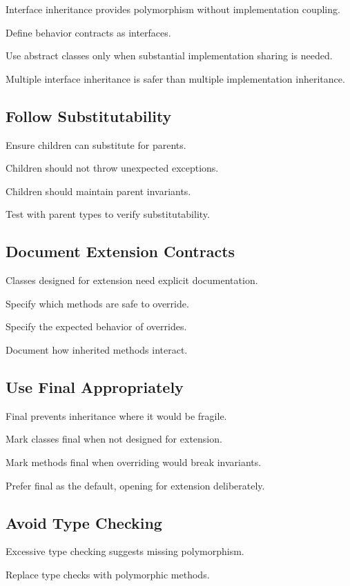 \documentclass[11pt]{article}
\begin{document}
Interface inheritance provides polymorphism without implementation coupling.

Define behavior contracts as interfaces.

Use abstract classes only when substantial implementation sharing is needed.

Multiple interface inheritance is safer than multiple implementation inheritance.

\subsection{Follow Substitutability}

Ensure children can substitute for parents.

Children should not throw unexpected exceptions.

Children should maintain parent invariants.

Test with parent types to verify substitutability.

\subsection{Document Extension Contracts}

Classes designed for extension need explicit documentation.

Specify which methods are safe to override.

Specify the expected behavior of overrides.

Document how inherited methods interact.

\subsection{Use Final Appropriately}

Final prevents inheritance where it would be fragile.

Mark classes final when not designed for extension.

Mark methods final when overriding would break invariants.

Prefer final as the default, opening for extension deliberately.

\subsection{Avoid Type Checking}

Excessive type checking suggests missing polymorphism.

Replace type checks with polymorphic methods.
\end{document}
